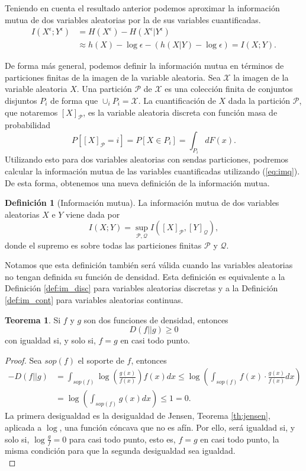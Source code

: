\documentclass[12pt,a4paper]{report} %
\theoremstyle{definition}
\newtheorem{definition}{Definición}[section]
\newtheorem{theorem}{Teorema}[section]
\begin{document}
Teniendo en cuenta el resultado anterior podemos aproximar la información mutua de dos variables aleatorias por la de sus variables cuantificadas.
\begin{align}\label{eq:imq}
  I(X^{\epsilon};Y^{\epsilon}) &= H(X^{\epsilon}) - H(X^{\epsilon}|Y^{\epsilon})\nonumber\\&\approx h(X) - \log\epsilon - (h(X|Y) - \log\epsilon) = I(X;Y).
\end{align}

De forma más general, podemos definir la información mutua en términos de particiones finitas de la imagen de la variable aleatoria. Sea $\mathcal{X}$ la imagen de la variable aleatoria $X$. Una partición $\mathcal{P}$ de $\mathcal{X}$ es una colección finita de conjuntos disjuntos $P_i$ de forma que $\cup_i P_i = \mathcal{X}$. La cuantificación de $X$ dada la partición $\mathcal{P}$, que notaremos $[X]_{\mathcal{P}}$, es la variable aleatoria discreta con función masa de probabilidad\[
P\left[[X]_{\mathcal{P}} = i\right ] = P [X\in P_i] = \int_{P_i}dF(x).
\]
Utilizando esto para dos variables aleatorias con sendas particiones, podremos calcular la información mutua de las variables cuantificadas utilizando (\ref{eq:imq}). De esta forma, obtenemos una nueva definición de la información mutua.\\

\begin{definition}[Información mutua]
  La información mutua de dos variables aleatorias $X$ e $Y$ viene dada por \[
I(X;Y) = \sup_{\mathcal{P},\mathcal{Q}}I\left ( [X]_{\mathcal{P}}, [Y]_{\mathcal{Q}} \right),
  \]donde el supremo es sobre todas las particiones finitas $\mathcal{P}$ y $\mathcal{Q}$.\\
\end{definition}
Notamos que esta definición también será válida cuando las variables aleatorias no tengan definida su función de densidad. Esta definición es equivalente a la Definición \ref{def:im_disc} para variables aleatorias discretas y a la Definición \ref{def:im_cont} para variables aleatorias continuas.\\

\begin{theorem}Si $f$ y $g$ son dos funciones de densidad, entonces\[
D\left ( f || g \right ) \ge 0
\]
con igualdad si, y solo si, $f = g$ en casi todo punto.
\end{theorem}
\begin{proof}
Sea $sop(f)$ el soporte de $f$, entonces 
\begin{align*}
  - D\left ( f || g \right ) &= \int_{sop(f)} \log \left(\frac{g(x)}{f(x)}\right ) f(x) dx  \leq \log \left( \int_{sop(f)} f(x)\cdot \frac{g(x)}{f(x)}dx \right)\\
  &= \log \left ( \int_{sop(f)}g(x)dx\right) \leq 1 = 0.
\end{align*}
La primera desigualdad es la desigualdad de Jensen, Teorema \ref{th:jensen}, aplicada a $\log$, una función cóncava que no es afín. Por ello, será igualdad si, y solo si, $\log \frac{g}{f} = 0$ para casi todo punto, esto es, $f=g$ en casi todo punto, la misma condición para que la segunda desigualdad sea igualdad.\\
\end{proof}
\end{document}
